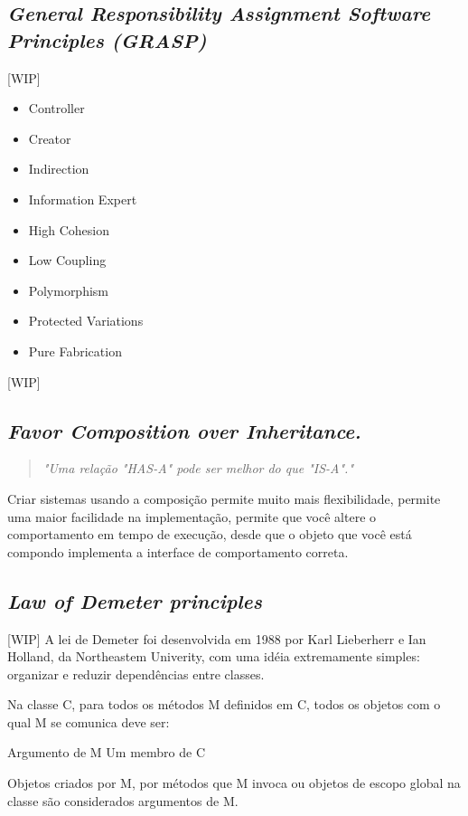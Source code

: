 \documentclass[12pt]{article}
\begin{document}
\subsection{\textit{General Responsibility Assignment Software Principles (GRASP)}} \label{sec:grasp}
[WIP]
\begin{itemize}
	\item Controller	
	\item Creator
	\item Indirection
	\item Information Expert
	\item High Cohesion
	\item Low Coupling
	\item Polymorphism
	\item Protected Variations
	\item Pure Fabrication
\end{itemize}
[WIP]

\subsection{\textit{Favor Composition over Inheritance.}} \label{sec:favor_composition}
\begin{quote}
\textit{"Uma relação "HAS-A" pode ser melhor do que "IS-A"."}\cite{HEADFIRST_DESIGN_PATTERN}
\end{quote}

Criar sistemas usando a composição permite muito mais flexibilidade, permite uma maior facilidade na implementação, permite que você altere o comportamento em tempo de execução, desde que o objeto que você está compondo implementa a interface de comportamento correta. 


\subsection{\textit{Law of Demeter principles}} \label{sec:law_of_demeter}
[WIP]
A lei de Demeter foi desenvolvida em 1988 por Karl Lieberherr e Ian Holland, da Northeastem Univerity, com uma idéia extremamente simples: organizar e reduzir dependências entre classes.

Na classe C, para todos os métodos M definidos em C, todos os objetos com o qual M se comunica deve ser:

    Argumento de M
    Um membro de C

Objetos criados por M, por métodos que M invoca ou objetos de escopo global na classe são considerados argumentos de M.
\end{document}

